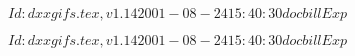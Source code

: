 \documentclass{article}
\begin{document}
$Id: dxxgifs.tex,v 1.14 2001-08-24 15:40:30 docbill Exp $


\pagebreak


$Id: dxxgifs.tex,v 1.14 2001-08-24 15:40:30 docbill Exp $


\pagebreak
\end{document}
